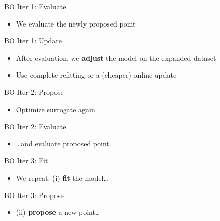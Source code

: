 \documentclass[main]{subfiles}
\begin{document}
\begin{frame}[t,noframenumbering]{BO Iter 1: Evaluate}
  \begin{itemize}
    \item We evaluate the newly proposed point
  \end{itemize}
\end{frame}


\begin{frame}[t,noframenumbering]{BO Iter 1: Update}
  \begin{itemize}
    \item After evaluation, we \textbf{adjust} the model on the expanded dataset
    \item Use complete refitting or a (cheaper) online update
  \end{itemize}
\end{frame}


\begin{frame}[t,noframenumbering]{BO Iter 2: Propose}
  \begin{itemize}
    \item Optimize surrogate again
  \end{itemize}
\end{frame}


\begin{frame}[t,noframenumbering]{BO Iter 2: Evaluate}
  \begin{itemize}
    \item \ldots and evaluate proposed point
  \end{itemize}
\end{frame}


\begin{frame}[t,noframenumbering]{BO Iter 3: Fit}
  \begin{itemize}
    \item We repeat: (i) \textbf{fit} the model\ldots
  \end{itemize}
\end{frame}


\begin{frame}[t,noframenumbering]{BO Iter 3: Propose}
  \begin{itemize}
    \item (ii) \textbf{propose} a new point\ldots
  \end{itemize}
\end{frame}
\end{document}

